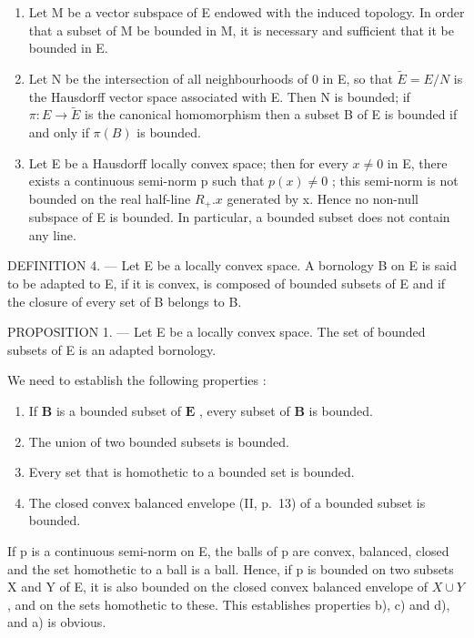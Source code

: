 \begin{enumerate}
\def\labelenumi{\arabic{enumi})}
\setcounter{enumi}{1}
\item
  Let M be a vector subspace of E endowed with the induced topology. In order that a subset of M be bounded in M, it is necessary and sufficient that it be bounded in E.
\item
  Let N be the intersection of all neighbourhoods of 0 in E, so that \(\tilde{E} = E/N\) is the Hausdorff vector space associated with E. Then N is bounded; if \(\pi: E \to \tilde{E}\) is the canonical homomorphism then a subset B of E is bounded if and only if \(\pi(B)\) is bounded.
\item
  Let E be a Hausdorff locally convex space; then for every \(x \neq 0\) in E, there exists a continuous semi-norm p such that \(p(x) \neq 0\) ; this semi-norm is not bounded on the real half-line \(R_{+}.x\) generated by x. Hence no non-null subspace of E is bounded. In particular, a bounded subset does not contain any line.
\end{enumerate}

DEFINITION 4. --- Let E be a locally convex space. A bornology B on E is said to be adapted to E, if it is convex, is composed of bounded subsets of E and if the closure of every set of B belongs to B.

PROPOSITION 1. --- Let E be a locally convex space. The set of bounded subsets of E is an adapted bornology.

We need to establish the following properties :

\begin{enumerate}
\def\labelenumi{\alph{enumi})}
\item
  If \(\mathbf{B}\) is a bounded subset of \(\mathbf{E}\) , every subset of \(\mathbf{B}\) is bounded.
\item
  The union of two bounded subsets is bounded.
\item
  Every set that is homothetic to a bounded set is bounded.
\item
  The closed convex balanced envelope (II, p.~13) of a bounded subset is bounded.
\end{enumerate}

If p is a continuous semi-norm on E, the balls of p are convex, balanced, closed and the set homothetic to a ball is a ball. Hence, if p is bounded on two subsets X and Y of E, it is also bounded on the closed convex balanced envelope of \(X \cup Y\) , and on the sets homothetic to these. This establishes properties b), c) and d), and a) is obvious.

